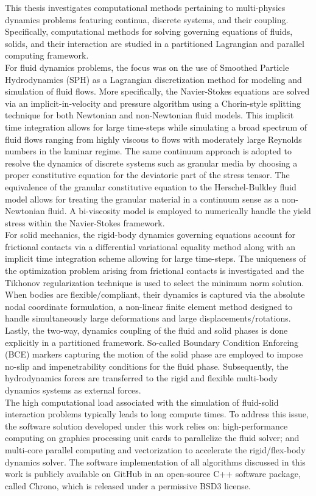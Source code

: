 This thesis investigates computational methods pertaining to multi-physics dynamics problems featuring continua, discrete systems, and their coupling. Specifically, computational methods for solving governing equations of fluids, solids, and their interaction are studied in a partitioned Lagrangian and parallel computing framework. \\
%
For fluid dynamics problems, the focus was on the use of Smoothed Particle Hydrodynamics (SPH) as a Lagrangian discretization method for modeling and simulation of fluid flows. More specifically, the Navier-Stokes equations are solved via an implicit-in-velocity and pressure algorithm using a Chorin-style splitting technique for both Newtonian and non-Newtonian fluid models. This implicit time integration allows for large time-steps while simulating a broad spectrum of fluid flows ranging from highly viscous to flows with moderately large Reynolds numbers in the laminar regime. The same continuum approach is adopted to resolve the dynamics of discrete systems such as granular media by choosing a proper constitutive equation for the deviatoric part of the stress tensor. The equivalence of the granular constitutive equation to the Herschel-Bulkley fluid model allows for treating the granular material in a continuum sense as a non-Newtonian fluid. A bi-viscosity model is employed to numerically handle the yield stress within the Navier-Stokes framework.\\
%
For solid mechanics, the rigid-body dynamics governing equations account for frictional contacts via a differential variational equality method along with an implicit time integration scheme allowing for large time-steps. The uniqueness of the optimization problem arising from frictional contacts is investigated and the Tikhonov regularization technique is used to select the minimum norm solution. When bodies are flexible/compliant, their dynamics is captured via the absolute nodal coordinate formulation, a non-linear finite element method designed to handle simultaneously large deformations and large displacements/rotations.\\
%
Lastly, the two-way, dynamics coupling of the fluid and solid phases is done explicitly in a partitioned framework. So-called Boundary Condition Enforcing (BCE) markers capturing the motion of the solid phase are employed to impose no-slip and impenetrability conditions for the fluid phase. Subsequently, the hydrodynamics forces are transferred to the rigid and flexible multi-body dynamics systems as external forces.\\
%
The high computational load associated with the simulation of fluid-solid interaction problems typically leads to long compute times. To address this issue, the software solution developed under this work relies on: high-performance computing on graphics processing unit cards to parallelize the fluid solver; and multi-core parallel computing and vectorization to accelerate the rigid/flex-body dynamics solver. The software implementation of all algorithms discussed in this work is publicly available on GitHub in an open-source C++ software package, called Chrono, which is released under a permissive BSD3 license.
